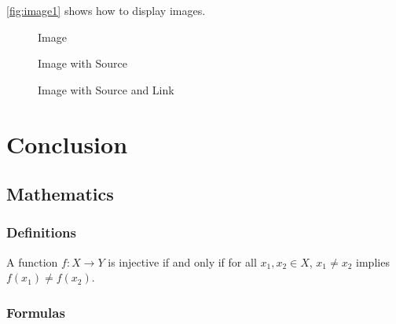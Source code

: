 \autoref{fig:image1} shows how to display images.

\begin{figure}[H]
	\centering
    \caption{Image}

	\label{fig:image1}
\end{figure}

\begin{figure}[H]
	\centering
    \caption{Image with Source}
	\label{fig:image2}
\end{figure}

\begin{figure}[H]
	\centering
    \caption{Image with Source and Link}
	\label{fig:image3}
\end{figure}





















\chapter{Conclusion}\label{ch:conclusion}

\section{Mathematics}\label{sec:maths}

\subsection{Definitions}

\begin{define}	
A function $f: X \rightarrow Y$ is injective if and only if for all $x_1, x_2 \in X$, $x_1 \neq x_2$ implies $f(x_1) \neq f(x_2)$.
\end{define}

\subsection{Formulas}

